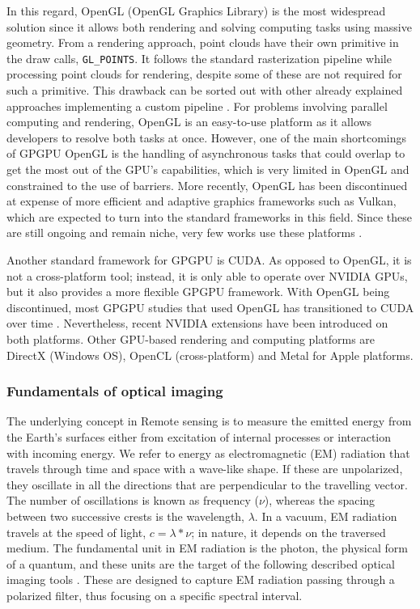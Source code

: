 In this regard, OpenGL (OpenGL Graphics Library) is the most widespread solution since it allows both rendering and solving computing tasks using massive geometry. From a rendering approach, point clouds have their own primitive in the draw calls, \verb|GL_POINTS|. It follows the standard rasterization pipeline while processing point clouds for rendering, despite some of these are not required for such a primitive. This drawback can be sorted out with other already explained approaches implementing a custom pipeline \cite{schutz_rendering_2021, schutz_software_2022}. For problems involving parallel computing and rendering, OpenGL is an easy-to-use platform as it allows developers to resolve both tasks at once. However, one of the main shortcomings of GPGPU OpenGL is the handling of asynchronous tasks that could overlap to get the most out of the GPU's capabilities, which is very limited in OpenGL and constrained to the use of barriers. More recently, OpenGL has been discontinued at expense of more efficient and adaptive graphics frameworks such as Vulkan, which are expected to turn into the standard frameworks in this field. Since these are still ongoing and remain niche, very few works use these platforms \cite{stumpfegger_gpu_2022}.  

Another standard framework for GPGPU is CUDA. As opposed to OpenGL, it is not a cross-platform tool; instead, it is only able to operate over NVIDIA GPUs, but it also provides a more flexible GPGPU framework. With OpenGL being discontinued, most GPGPU studies that used OpenGL has transitioned to CUDA over time \cite{schutz_gpu-accelerated_2023}. Nevertheless, recent NVIDIA extensions have been introduced on both platforms. Other GPU-based rendering and computing platforms are DirectX \cite{baek_accelerated_2020} (Windows OS), OpenCL (cross-platform) and Metal for Apple platforms. 

\subsubsection{Fundamentals of optical imaging}

The underlying concept in \gls{Remote sensing} is to measure the emitted energy from the Earth's surfaces either from excitation of internal processes or interaction with incoming energy. We refer to energy as electromagnetic (EM) radiation that travels through time and space with a wave-like shape. If these are unpolarized, they oscillate in all the directions that are perpendicular to the travelling vector. The number of oscillations is known as frequency ($\nu$), whereas the spacing between two successive crests is the wavelength, $\lambda$. In a vacuum, EM radiation travels at the speed of light, $c = \lambda * \nu$; in nature, it depends on the traversed medium. The fundamental unit in EM radiation is the photon, the physical form of a quantum, and these units are the target of the following described optical imaging tools \cite{emery_introduction_2017}. These are designed to capture EM radiation passing through a polarized filter, thus focusing on a specific spectral interval.


